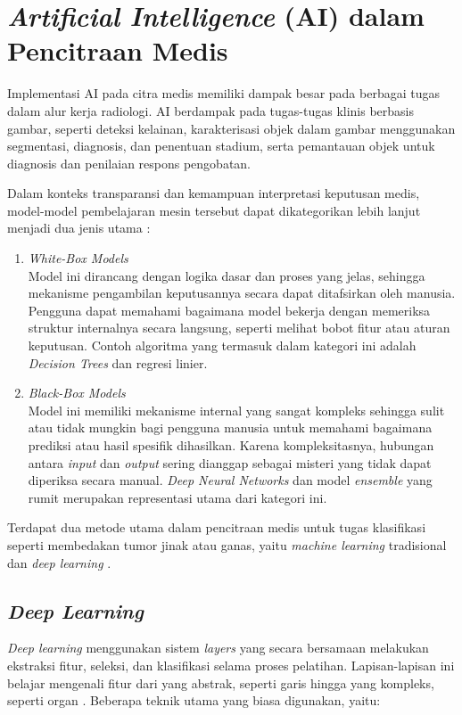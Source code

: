 \section{\textit{Artificial Intelligence} (AI) dalam Pencitraan Medis}
Implementasi AI pada citra medis memiliki dampak besar pada berbagai tugas dalam alur kerja radiologi. AI berdampak pada tugas-tugas klinis berbasis gambar, seperti deteksi kelainan, karakterisasi objek dalam gambar menggunakan segmentasi, diagnosis, dan penentuan stadium, serta pemantauan objek untuk diagnosis dan penilaian respons pengobatan.

Dalam konteks transparansi dan kemampuan interpretasi keputusan medis, model-model pembelajaran mesin tersebut dapat dikategorikan lebih lanjut menjadi dua jenis utama \autocite{moreira2024benchmarking}:

\begin{enumerate}
	\item \textit{White-Box Models} \\
	Model ini dirancang dengan logika dasar dan proses yang jelas, sehingga mekanisme pengambilan keputusannya secara dapat ditafsirkan oleh manusia. Pengguna dapat memahami bagaimana model bekerja dengan memeriksa struktur internalnya secara langsung, seperti melihat bobot fitur atau aturan keputusan. Contoh algoritma yang termasuk dalam kategori ini adalah \textit{Decision Trees} dan regresi linier.
	
	\item \textit{Black-Box Models} \\
	Model ini memiliki mekanisme internal yang sangat kompleks sehingga sulit atau tidak mungkin bagi pengguna manusia untuk memahami bagaimana prediksi atau hasil spesifik dihasilkan. Karena kompleksitasnya, hubungan antara \textit{input} dan \textit{output} sering dianggap sebagai misteri yang tidak dapat diperiksa secara manual. \textit{Deep Neural Networks} dan model \textit{ensemble} yang rumit merupakan representasi utama dari kategori ini.
\end{enumerate}

Terdapat dua metode utama dalam pencitraan medis untuk tugas klasifikasi seperti membedakan tumor jinak atau ganas, yaitu \textit{machine learning} tradisional dan \textit{deep learning} \autocite{hosny2018artificial}.

\subsection{\textit{Deep Learning}}
\textit{Deep learning} menggunakan sistem \textit{layers} yang secara bersamaan melakukan ekstraksi fitur, seleksi, dan klasifikasi selama proses pelatihan. Lapisan-lapisan ini belajar mengenali fitur dari yang abstrak, seperti garis hingga yang kompleks, seperti organ \autocite{hosny2018artificial}. Beberapa teknik utama yang biasa digunakan, yaitu:

